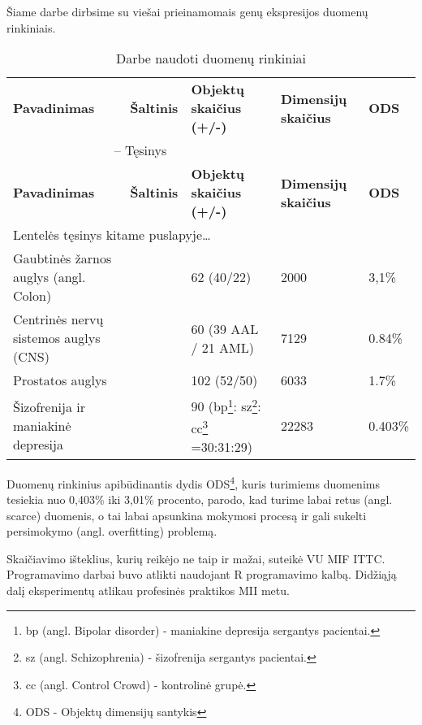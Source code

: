 Šiame darbe dirbsime su viešai prieinamomais genų ekspresijos duomenų rinkiniais.
\begin{longtable}{|p{4cm}|p{1.4cm}|p{2.5cm}|p{1.6cm}|p{1cm}|}
\captionsetup{labelsep=period}
\caption{Darbe naudoti duomenų rinkiniai\label{table:datasets}}\\
\hline \hline
{\textbf{Pavadinimas}} &
{\textbf{Šaltinis}} &
{\textbf{Objektų skaičius (+/-)}}&
{\textbf{Dimensijų skaičius}}&
{\textbf{ODS}}\\
\hline
\endfirsthead
\multicolumn{3}{c}{{\tablename} \thetable{} -- Tęsinys} \\[0.5ex]
\hline \hline
{\textbf{Pavadinimas}} &
{\textbf{Šaltinis}} &
{\textbf{Objektų skaičius (+/-)}}&
{\textbf{Dimensijų skaičius}}&
{\textbf{ODS}}\\
\hline
\endhead
\multicolumn{3}{l}{{Lentelės tęsinys kitame puslapyje\ldots}} \\
\endfoot
\hline \hline
\endlastfoot
\hline 
Gaubtinės žarnos auglys (angl. Colon) 
& 
\cite{alon1999broad} 
& 
62 (40/22) 
& 
2000 
& 
3,1\% \\
\hline
Centrinės nervų sistemos auglys (CNS) 
& 
\cite{pomeroy2002prediction} 
& 
60 (39 AAL / 21 AML) 
& 
7129 
& 
0.84\% \\
\hline
Prostatos auglys 
& 
\cite{singh2002gene} 
& 
102 (52/50) 
& 
6033 
& 
1.7\% \\
\hline
Šizofrenija ir maniakinė depresija
&
\cite{altara}
&
90 (bp\footnote{bp (angl. Bipolar disorder) - maniakine depresija sergantys pacientai.}:
sz\footnote{sz (angl. Schizophrenia) - šizofrenija sergantys pacientai.}:
cc\footnote{cc (angl. Control Crowd) - kontrolinė grupė.} =30:31:29)
&
22283
&
0.403\% \\
\hline
\end{longtable}
Duomenų rinkinius apibūdinantis dydis ODS\footnote{ODS - Objektų dimensijų santykis},
kuris turimiems duomenims tesiekia nuo  0,403\% iki 3,01\% procento,
parodo, kad turime labai retus (angl. scarce) duomenis, o tai labai apsunkina
mokymosi procesą ir gali sukelti persimokymo (angl. overfitting) problemą.

Skaičiavimo išteklius, kurių reikėjo ne taip ir mažai, suteikė VU MIF ITTC.
Programavimo darbai buvo atlikti naudojant R programavimo kalbą. Didžiąją
dalį eksperimentų atlikau profesinės praktikos MII metu.

